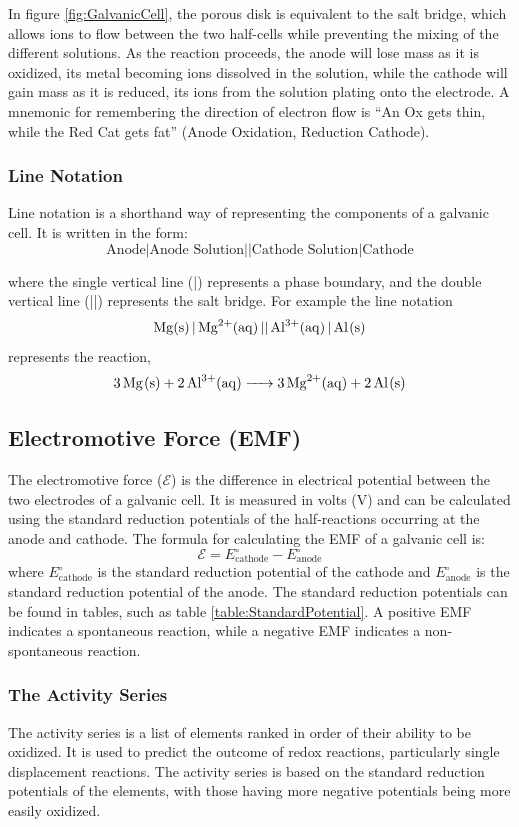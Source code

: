 In figure \ref{fig:GalvanicCell}, the porous disk is equivalent to the salt bridge, which allows ions to flow between the two half-cells while preventing the mixing of the different solutions. As the reaction proceeds, the anode will lose mass as it is oxidized, its metal becoming ions dissolved in the solution, while the cathode will gain mass as it is reduced, its ions from the solution plating onto the electrode. A mnemonic for remembering the direction of electron flow is ``An Ox gets thin, while the Red Cat gets fat'' (Anode Oxidation, Reduction Cathode).
\subsubsection{Line Notation}
Line notation is a shorthand way of representing the components of a galvanic cell. It is written in the form:
\[\text{Anode} | \text{Anode Solution} || \text{Cathode Solution} | \text{Cathode}\]

where the single vertical line (|) represents a phase boundary, and the double vertical line (||) represents the salt bridge. For example the line notation 
\[\ce{Mg(s) | Mg^{2+}(aq) || Al^{3+}(aq) | Al(s)}\]
represents the reaction,
\[\ce{3Mg(s) + 2Al^{3+}(aq) -> 3Mg^{2+}(aq) + 2Al(s)}\]
\subsection{Electromotive Force (EMF)}
The electromotive force ($\mathcal{E}$) is the difference in electrical potential between the two electrodes of a galvanic cell. It is measured in volts (V) and can be calculated using the standard reduction potentials of the half-reactions occurring at the anode and cathode. The formula for calculating the EMF of a galvanic cell is:
\begin{equation}\label{eq:EMF}
\mathcal{E} = E^\circ_{\text{cathode}} - E^\circ_{\text{anode}}
\end{equation}
where $E^\circ_{\text{cathode}}$ is the standard reduction potential of the cathode and $E^\circ_{\text{anode}}$ is the standard reduction potential of the anode. The standard reduction potentials can be found in tables, such as table \ref{table:StandardPotential}. A positive EMF indicates a spontaneous reaction, while a negative EMF indicates a non-spontaneous reaction. 
\subsubsection{The Activity Series}
The activity series is a list of elements ranked in order of their ability to be oxidized. It is used to predict the outcome of redox reactions, particularly single displacement reactions. The activity series is based on the standard reduction potentials of the elements, with those having more negative potentials being more easily oxidized. 
